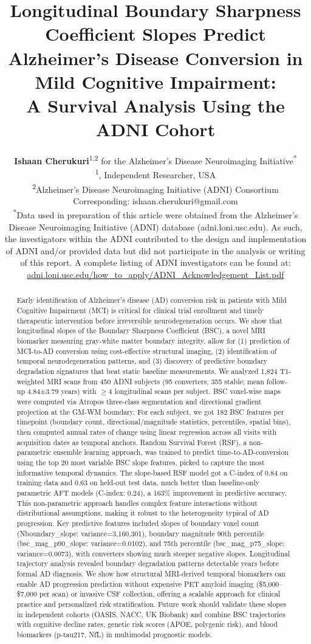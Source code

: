 \documentclass[blue]{ludusofficial}  %
\title{Longitudinal Boundary Sharpness Coefficient Slopes Predict Alzheimer's Disease Conversion in Mild Cognitive Impairment:\\[8pt]A Survival Analysis Using the ADNI Cohort}
\author{%
    \textbf{Ishaan Cherukuri}\textsuperscript{1,2} for the Alzheimer's Disease Neuroimaging Initiative\textsuperscript{*}\\[0.2cm]
    \mdseries\small\textsuperscript{1}, Independent Researcher, USA\\
    \small\textsuperscript{2}Alzheimer's Disease Neuroimaging Initiative (ADNI) Consortium\\
    \small Corresponding: ishaan.cherukuri@gmail.com\\[0.4cm]
    \small\textsuperscript{*}Data used in preparation of this article were obtained from the Alzheimer's Disease Neuroimaging Initiative (ADNI) database (adni.loni.usc.edu). As such, the investigators within the ADNI contributed to the design and implementation of ADNI and/or provided data but did not participate in the analysis or writing of this report. A complete listing of ADNI investigators can be found at: \href{http://adni.loni.usc.edu/wp-content/uploads/how_to_apply/ADNI_Acknowledgement_List.pdf}{adni.loni.usc.edu/how\_to\_apply/ADNI\_Acknowledgement\_List.pdf}
}
\begin{document}
\begin{abstract}
Early identification of Alzheimer's disease (AD) conversion risk in patients with Mild Cognitive Impairment (MCI) is critical for clinical trial enrollment and timely therapeutic intervention before irreversible neurodegeneration occurs. We show that longitudinal slopes of the Boundary Sharpness Coefficient (BSC), a novel MRI biomarker measuring gray-white matter boundary integrity, allow for (1) prediction of MCI-to-AD conversion using cost-effective structural imaging, (2) identification of temporal neurodegeneration patterns, and (3) discovery of predictive boundary degradation signatures that beat static baseline measurements. We analyzed 1,824 T1-weighted MRI scans from 450 ADNI subjects (95 converters, 355 stable; mean follow-up 4.84±3.79 years) with $\geq$4 longitudinal scans per subject. BSC voxel-wise maps were computed via Atropos three-class segmentation and directional gradient projection at the GM-WM boundary. For each subject, we got 182 BSC features per timepoint (boundary count, directional/magnitude statistics, percentiles, spatial bins), then computed annual rates of change using linear regression across all visits with acquisition dates as temporal anchors. Random Survival Forest (RSF), a non-parametric ensemble learning approach, was trained to predict time-to-AD-conversion using the top 20 most variable BSC slope features, picked to capture the most informative temporal dynamics. The slope-based RSF model got a C-index of 0.84 on training data and 0.63 on held-out test data, much better than baseline-only parametric AFT models (C-index: 0.24), a 163\% improvement in predictive accuracy. This non-parametric approach handles complex feature interactions without distributional assumptions, making it robust to the heterogeneity typical of AD progression. Key predictive features included slopes of boundary voxel count (Nboundary\_slope: variance=3,160,301), boundary magnitude 90th percentile (bsc\_mag\_p90\_slope: variance=0.0102), and 75th percentile (bsc\_mag\_p75\_slope: variance=0.0073), with converters showing much steeper negative slopes. Longitudinal trajectory analysis revealed boundary degradation patterns detectable years before formal AD diagnosis. We show how structural MRI-derived temporal biomarkers can enable AD progression prediction without expensive PET amyloid imaging (\$5,000--\$7,000 per scan) or invasive CSF collection, offering a scalable approach for clinical practice and personalized risk stratification. Future work should validate these slopes in independent cohorts (OASIS, NACC, UK Biobank) and combine BSC trajectories with cognitive decline rates, genetic risk scores (APOE, polygenic risk), and blood biomarkers (p-tau217, NfL) in multimodal prognostic models.
\end{abstract}
\end{document}
